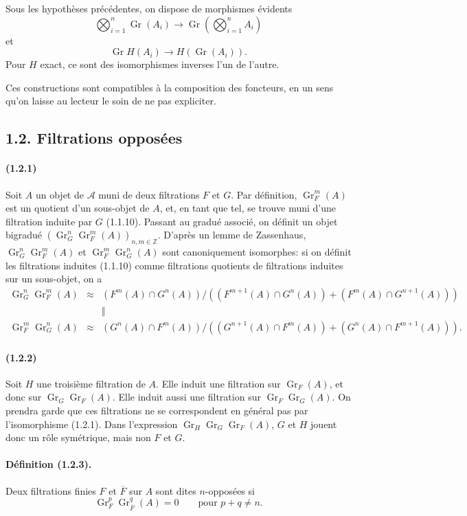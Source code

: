 \documentclass[10pt]{article}
\newcommand{\Z}{\mathbb Z}
\newcommand{\Gr}{\operatorname{Gr}}
\newcommand{\calA}{\mathcal A}
\begin{document}
Sous les hypothèses précédentes, on dispose de morphismes évidents
\[
\bigotimes_{i=1}^n\Gr(A_i)\to \Gr\left(\bigotimes_{i=1}^nA_i\right)
\]
et
\[
\Gr H(A_i)\to H(\Gr(A_i)).
\]
Pour $H$ exact, ce sont des isomorphismes inverses l'un de l'autre.

Ces constructions sont compatibles à la composition des foncteurs, en un sens qu'on laisse au lecteur le soin de ne pas expliciter.

\subsection*{1.2. Filtrations opposées}

\paragraph{(1.2.1)} Soit $A$ un objet de $\calA$ muni de deux filtrations $F$ et $G$. Par définition, $\Gr_F^m(A)$ est un quotient d'un sous-objet de $A$, et, en tant que tel, se trouve muni d'une filtration induite par $G$ (1.1.10). Passant au gradué associé, on définit un objet bigradué $(\Gr_G^n\Gr_F^m(A))_{n,m\in\Z}$. D'après un lemme de Zassenhaus, $\Gr_G^n\Gr_F^m(A)$ et $\Gr_F^m\Gr_G^n(A)$ sont canoniquement isomorphes: si on définit les filtrations induites (1.1.10) comme filtrations quotients de filtrations induites sur un sous-objet, on a
\[
\begin{array}{rcc}
\Gr_G^n\Gr_F^m(A)&\approx&
(F^m(A)\cap G^n(A))/((F^{m+1}(A)\cap G^n(A))+(F^m(A)\cap G^{n+1}(A)))\\
&&\Big\Vert\\
\Gr_F^m\Gr_G^n(A)&\approx&
(G^n(A)\cap F^m(A))/((G^{n+1}(A)\cap F^m(A))+(G^n(A)\cap F^{m+1}(A))).
\end{array}
\]

\paragraph{(1.2.2)} Soit $H$ une troisième filtration de $A$. Elle induit une filtration sur $\Gr_F(A)$, et donc sur $\Gr_G\Gr_F(A)$. Elle induit aussi une filtration sur $\Gr_F\Gr_G(A)$. On prendra garde que ces filtrations ne se correspondent en général pas par l'isomorphisme (1.2.1). Dans l'expression $\Gr_H\Gr_G\Gr_F(A)$, $G$ et $H$ jouent donc un rôle symétrique, mais non $F$ et $G$.

\paragraph{Définition (1.2.3).} Deux filtrations finies $F$ et $\overline F$ sur $A$ sont dites $n$-opposées si
\[
\Gr_F^p\Gr_{\overline F}^{q}(A)=0\qquad\text{pour }p+q\ne n.
\]
\end{document}
